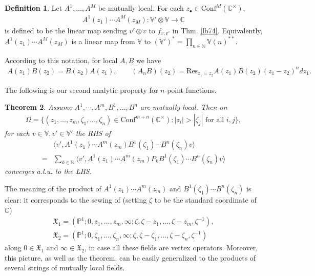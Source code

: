 \documentclass[12pt,a4paper,notitlepage]{article}
\theoremstyle{definition}
\newtheorem{df}{Definition}[section]
\theoremstyle{plain}
\newtheorem{thm}[df]{Theorem}
\newcommand{\fk}{\mathfrak}
\newcommand{\Conf}{\mathrm{Conf}}
\newcommand{\Res}{\mathrm{Res}}
\newcommand{\bk}[1]{\langle {#1}\rangle}
\newcommand{\blt}{\bullet}
\newcommand{\Vbb}{\mathbb V}
\newcommand{\Cbb}{\mathbb C}
\newcommand{\Nbb}{\mathbb N}
\newcommand{\Pbb}{\mathbb P}
\numberwithin{equation}{section}
\begin{document}
\subsection{}
\begin{df}\label{lb75}
	Let $A^1,\dots,A^M$ be mutually local. For each $z_\blt\in\Conf^M(\Cbb^\times)$,
	\begin{align}
		A^1(z_1)\cdots A^M(z_M):\Vbb'\otimes\Vbb\rightarrow\Cbb	
	\end{align}
is defined to be the linear map sending $v'\otimes v$ to $f_{v,v'}$ in Thm. \ref{lb74}. Equivalently, $A^1(z_1)\cdots A^M(z_M)$ is a linear map from $\Vbb$ to $(\Vbb')^*=\prod_{n\in\Nbb}\Vbb(n)^{**}$.
\end{df}
According to this notation, for local $A,B$ we have
\begin{align}
	A(z_1)B(z_2)=B(z_2)A(z_1),\qquad (A_nB)(z_2)=\Res_{z_1=z_2}A(z_1)B(z_2)(z_1-z_2)^ndz_1.
\end{align}


The following is our second analytic property for $n$-point functions.

\begin{thm}\label{lb77}
Assume $A^1,\cdots,A^m,B^1,\dots,B^n$ are mutually local. Then on
\begin{align*}
\Omega=\{(z_1,\dots,z_m,\zeta_1,\dots,\zeta_n)\in\Conf^{m+n}(\Cbb^\times):|z_i|>|\zeta_j|\text{ for all }i,j\},
\end{align*}
for each $v\in\Vbb,v'\in\Vbb'$ the RHS of
\begin{align}
&\bk{v',A^1(z_1)\cdots A^m(z_m)B^1(\zeta_1)\cdots B^n(\zeta_n)v}\nonumber\\
=&\sum_{k\in\Nbb}	\bk{v',A^1(z_1)\cdots A^m(z_m)P_kB^1(\zeta_1)\cdots B^n(\zeta_n)v}\label{eq122}
\end{align}
converges a.l.u. to the LHS.
\end{thm}



The meaning of the product of $A^1(z_1)\cdots A^m(z_m)$ and $B^1(\zeta_1)\cdots B^n(\zeta_n)$ is clear: it corresponds to the sewing of (setting $\zeta$ to be the standard coordinate of $\Cbb$)
\begin{gather*}
\fk X_1=(\Pbb^1;0,z_1,\dots,z_m,\infty;\zeta,\zeta-z_1,\dots,\zeta-z_m,\zeta^{-1}),\\
\fk X_2=(\Pbb^1;0,\zeta_1,\dots,\zeta_n,\infty;\zeta,\zeta-\zeta_1,\dots,\zeta-\zeta_n,\zeta^{-1})	
\end{gather*}
along $0\in\fk X_1$ and $\infty\in\fk X_2$, in case all these fields are vertex operators.  Moreover, this picture, as well as the theorem, can be easily generalized to the products of several strings of mutually local fields.
\end{document}
